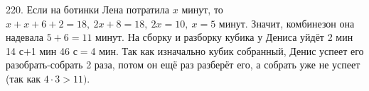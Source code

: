 220. Если на ботинки Лена потратила $x$ минут, то  $x+x+6+2=18,\ 2x+8=18,\ 2x=10,\ x=5$ минут. Значит, комбинезон она надевала $5+6=11$ минут. На сборку и разборку кубика у Дениса уйдёт 2 мин 14 с$+$1 мин 46 с$=$4 мин. Так как изначально кубик собранный, Денис успеет его разобрать-собрать 2 раза, потом он ещё раз разберёт его, а собрать уже не успеет (так как $4\cdot3>11).$\\
